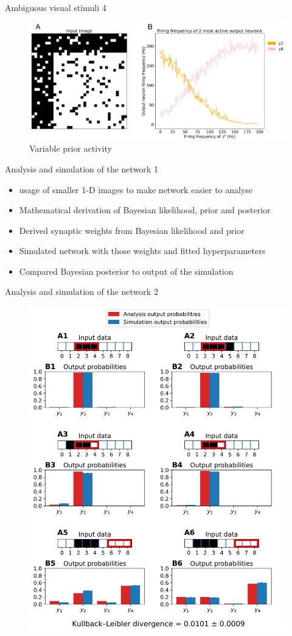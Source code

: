 \documentclass[aspectratio=169]{beamer}
\begin{document}
\begin{frame}{Ambiguous visual stimuli 4}
		\begin{figure}
        \includegraphics[width=0.7\linewidth]{../Latex/figures/horvertAdaptiveInh/YFrequency_prior.png}
      \\   \scriptsize Variable prior activity
      \end{figure} 
\end{frame}

\begin{frame}{Analysis and
 simulation of the network 1}
	\begin{itemize}
	  \item usage of smaller 1-D images to make network easier to analyse 
	  \item Mathematical derivation of Bayesian likelihood, prior and posterior
	  \item Derived synaptic weights from Bayesian likelihood and prior
	  \item Simulated network with those weights and fitted hyperparameters
	  \item Compared Bayesian posterior to output of the simulation
	\end{itemize}
\end{frame}

\begin{frame}{Analysis and
 simulation of the network 2}
 \vspace{-1.0cm}
		\begin{figure}
        \includegraphics[width=0.35\linewidth]{../Latex/figures/1D/1D_98_440_4.png}
      \end{figure} 
\end{frame}
\end{document}
